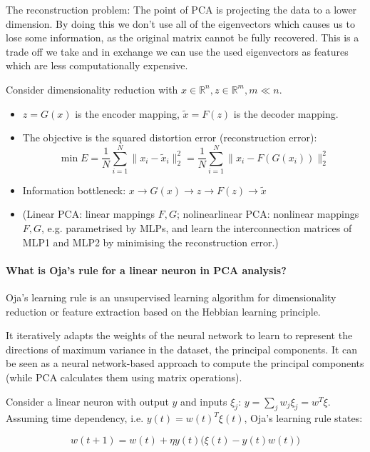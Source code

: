 The reconstruction problem: The point of PCA is projecting the data to a lower dimension. By doing this we don't use all of the
eigenvectors which causes us to lose some information, as the original matrix cannot be fully
recovered. This is a trade off we take and in exchange we can use the used eigenvectors as features
which are less computationally expensive.

Consider dimensionality reduction with $x \in \mathbb{R}^n, z \in \mathbb{R}^m, m \ll n$.

\begin{itemize}
    \item $z = G(x)$ is the encoder mapping, $\tilde{x} = F(z)$ is the decoder mapping.
    \item The objective is the squared distortion error (reconstruction error):
          $$\min{E} = \frac{1}{N} \sum_{i=1}^N{\lVert x_i - \tilde{x}_i \rVert_2^2} = \frac{1}{N} \sum_{i=1}^N{\lVert x_i - F(G(x_i)) \rVert_2^2}$$
          \item Information bottleneck: $x \rightarrow G(x) \rightarrow z \rightarrow F(z) \rightarrow \tilde{x}$
          \item (Linear PCA: linear mappings $F, G$; nolinearlinear PCA: nonlinear mappings $F, G$, e.g. parametrised by MLPs, and learn the interconnection matrices of MLP1 and MLP2 by minimising the reconstruction error.)
\end{itemize}

\paragraph{What is Oja's rule for a linear neuron in PCA analysis?}

Oja's learning rule is an unsupervised learning algorithm
for dimensionality reduction or feature extraction based on the Hebbian learning principle.

It iteratively adapts the weights of the neural network to learn to represent the
directions of maximum variance in the dataset, the principal components.
It can be seen as a neural network-based approach to compute the principal components
(while PCA calculates them using matrix operations).

Consider a linear neuron with output $y$ and inputs $\xi_j$: $y = \sum_j{w_j \xi_j} = w^T \xi$.
Assuming time dependency, i.e. $y(t) = w(t)^T \xi(t)$, Oja's learning rule states:

$$
w(t+1) = w(t) + \eta y(t) \big( \xi(t) - y(t) w(t) \big)
$$

